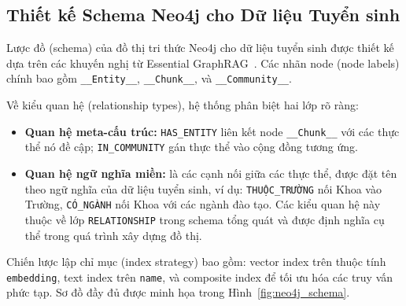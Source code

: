 \documentclass[12pt,a4paper]{report}
\theoremstyle{plain}
\theoremstyle{definition}
\begin{document}
	\subsection{Thiết kế Schema Neo4j cho Dữ liệu Tuyển sinh}
	\label{subsec:neo4j_schema}
	
	
	Lược đồ (schema) của đồ thị tri thức Neo4j cho dữ liệu tuyển sinh được thiết
	kế dựa trên các khuyến nghị từ Essential GraphRAG~\cite{neo4j2024essential}.
	Các nhãn node (node labels) chính bao gồm \texttt{\_\_Entity\_\_},
	\texttt{\_\_Chunk\_\_}, và \texttt{\_\_Community\_\_}.
	
	Về kiểu quan hệ (relationship types), hệ thống phân biệt hai lớp rõ ràng:
	\begin{itemize}
		\item \textbf{Quan hệ meta-cấu trúc:} \texttt{HAS\_ENTITY} liên kết node
		\texttt{\_\_Chunk\_\_} với các thực thể nó đề cập; \texttt{IN\_COMMUNITY}
		gán thực thể vào cộng đồng tương ứng.
		\item \textbf{Quan hệ ngữ nghĩa miền:} là các cạnh nối giữa các thực thể,
		được đặt tên theo ngữ nghĩa của dữ liệu tuyển sinh, ví dụ:
		\texttt{THUỘC\_TRƯỜNG} nối Khoa vào Trường, \texttt{CÓ\_NGÀNH} nối Khoa
		với các ngành đào tạo. Các kiểu quan hệ này thuộc về lớp \texttt{RELATIONSHIP}
		trong schema tổng quát và được định nghĩa cụ thể trong quá trình xây dựng đồ thị.
	\end{itemize}
	
	Chiến lược lập chỉ mục (index strategy) bao gồm: vector index trên thuộc
	tính \texttt{embedding}, text index trên \texttt{name}, và composite index
	để tối ưu hóa các truy vấn phức tạp. Sơ đồ đầy đủ được minh họa trong
	Hình~\ref{fig:neo4j_schema}.
	
\end{document}
